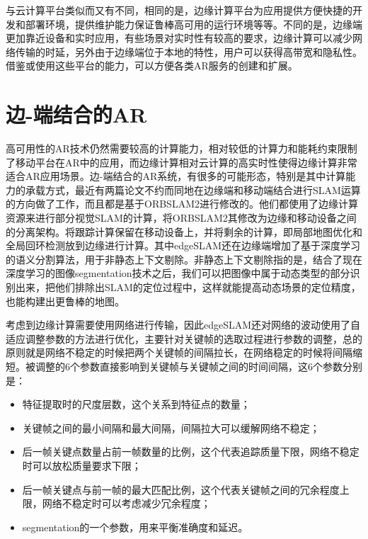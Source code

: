 与云计算平台类似而又有不同，相同的是，边缘计算平台为应用提供方便快捷的开发和部署环境，提供维护能力保证鲁棒高可用的运行环境等等。不同的是，边缘端更加靠近设备和实时应用，有些场景对实时性有较高的要求，边缘计算可以减少网络传输的时延，另外由于边缘端位于本地的特性，用户可以获得高带宽和隐私性。借鉴或使用这些平台的能力，可以方便各类AR服务的创建和扩展。

\section{边-端结合的AR}
高可用性的AR技术仍然需要较高的计算能力，相对较低的计算力和能耗约束限制了移动平台在AR中的应用，而边缘计算相对云计算的高实时性使得边缘计算非常适合AR应用场景。边-端结合的AR系统，有很多的可能形态，特别是其中计算能力的承载方式，最近有两篇论文不约而同地在边缘端和移动端结合进行SLAM运算的方向做了工作，而且都是基于ORBSLAM2进行修改的。他们都使用了边缘计算资源来进行部分视觉SLAM的计算，将ORBSLAM2其修改为边缘和移动设备之间的分离架构。将跟踪计算保留在移动设备上，并将剩余的计算，即局部地图优化和全局回环检测放到边缘进行计算。其中edgeSLAM\cite{ben2020edge}还在边缘端增加了基于深度学习的语义分割算法，用于非静态上下文剔除。非静态上下文剔除指的是，结合了现在深度学习的图像segmentation技术之后，我们可以把图像中属于动态类型的部分识别出来，把他们排除出SLAM的定位过程中，这样就能提高动态场景的定位精度，也能构建出更鲁棒的地图。

考虑到边缘计算需要使用网络进行传输，因此edgeSLAM还对网络的波动使用了自适应调整参数的方法进行优化，主要针对关键帧的选取过程进行参数的调整，总的原则就是网络不稳定的时候把两个关键帧的间隔拉长，在网络稳定的时候将间隔缩短。被调整的6个参数直接影响到关键帧与关键帧之间的时间间隔，这6个参数分别是：
\begin{itemize}
  \item 特征提取时的尺度层数，这个关系到特征点的数量；
  \item 关键帧之间的最小间隔和最大间隔，间隔拉大可以缓解网络不稳定；
  \item 后一帧关键点数量占前一帧数量的比例，这个代表追踪质量下限，网络不稳定时可以放松质量要求下限；
  \item 后一帧关键点与前一帧的最大匹配比例，这个代表关键帧之间的冗余程度上限，网络不稳定时可以考虑减少冗余程度；
  \item segmentation的一个参数，用来平衡准确度和延迟。
\end{itemize}

